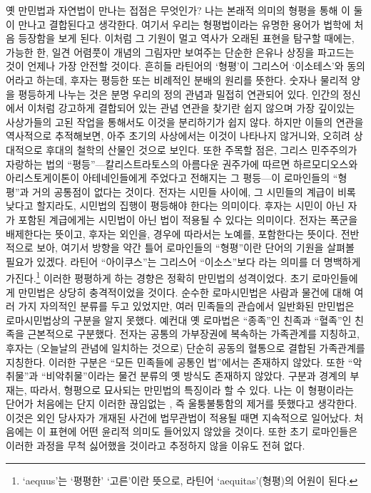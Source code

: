 옛 만민법과 자연법이 만나는 접점은 무엇인가?
나는 본래적 의미의 형평을 통해
이 둘이 만나고 결합된다고 생각한다.
여기서 우리는 형평법이라는 유명한 용어가
법학에 처음 등장함을 보게 된다.
이처럼 그 기원이 멀고 역사가 오래된 표현을 탐구할 때에는,
가능한 한,
일견 어렴풋이 개념의 그림자만 보여주는
단순한 은유나 상징을 파고드는 것이
언제나 가장 안전할 것이다.
흔히들 라틴어의 `형평'이 그리스어 `이소테스'와 동의어라고
하는데, 후자는 평등한 또는 비례적인 분배의 원리를 뜻한다.
숫자나 물리적 양을 평등하게 나누는 것은 분명 우리의 정의 관념과
밀접히 연관되어 있다.
인간의 정신에서 이처럼 강고하게 결합되어 있는 관념 연관을 찾기란 쉽지 않으며
가장 깊이있는 사상가들의 고된 작업을 통해서도 이것을 분리하기가 쉽지 않다.
하지만 이들의 연관을 역사적으로 추적해보면,
아주 초기의 사상에서는 이것이 나타나지 않거니와,
오히려 상대적으로 후대의 철학의 산물인 것으로 보인다.
또한 주목할 점은, 그리스 민주주의가 자랑하는
법의 ``평등''---칼리스트라토스의
아름다운 권주가에 따르면
하르모디오스와 아리스토게이톤이
아테네인들에게 주었다고 전해지는 그 평등---이
로마인들의 ``형평''과 거의 공통점이 없다는 것이다.
전자는 시민들 사이에, 그 시민들의 계급이 비록 낮다고 할지라도,
시민법의 집행이 평등해야 한다는 의미이다.
후자는 시민이 아닌 자가 포함된 계급에게는 시민법이 아닌 법이
적용될 수 있다는 의미이다.
전자는 폭군을 배제한다는 뜻이고, 후자는 외인을, 경우에 따라서는 노예를,
포함한다는 뜻이다.
전반적으로 보아, 여기서 방향을 약간 틀어 로마인들의 ``형평''이란 단어의
기원을 살펴볼 필요가 있겠다.
라틴어 ``아이쿠스''는 그리스어 ``이소스''보다
라는 의미를 더 명백하게 가진다.\footnote{%
  `aequus'는 `평평한' `고른'이란 뜻으로, 라틴어 `aequitas'(형평)의 어원이 된다.}
이러한 평평하게 하는 경향은 정확히 만민법의 성격이었다.
초기 로마인들에게 만민법은 상당히 충격적이었을 것이다.
순수한 로마시민법은 사람과 물건에 대해 여러 가지 자의적인 분류를 두고 있었지만,
여러 민족들의 관습에서 일반화된 만민법은 로마시민법상의 구분을
알지 못했다.
예컨대 옛 로마법은 ``종족''인 친족과
``혈족''인 친족을 근본적으로 구분했다.
전자는 공통의 가부장권에 복속하는 가족관계를 지칭하고,
후자는 {\small (오늘날의 관념에 일치하는 것으로)} 단순히 공동의 혈통으로
결합된 가족관계를 지칭한다.
이러한 구분은 ``모든 민족들에 공통인 법''에서는 존재하지 않았다.
또한 ``악취물''과
``비악취물''이라는
물건 분류의 옛 방식도 존재하지 않았다.
구분과 경계의 부재는, 따라서, 형평으로 묘사되는 만민법의
특징이라 할 수 있다.
나는 이 형평이라는 단어가 처음에는 단지
이러한 끊임없는 , 즉
울퉁불퉁함의 제거를 뜻했다고 생각한다.
이것은 외인 당사자가 개재된 사건에 법무관법이 적용될 때면 지속적으로 일어났다.
처음에는 이 표현에 어떤 윤리적 의미도 들어있지 않았을 것이다.
또한 초기 로마인들은 이러한 과정을 무척 싫어했을 것이라고
추정하지 않을 이유도 전혀 없다.

